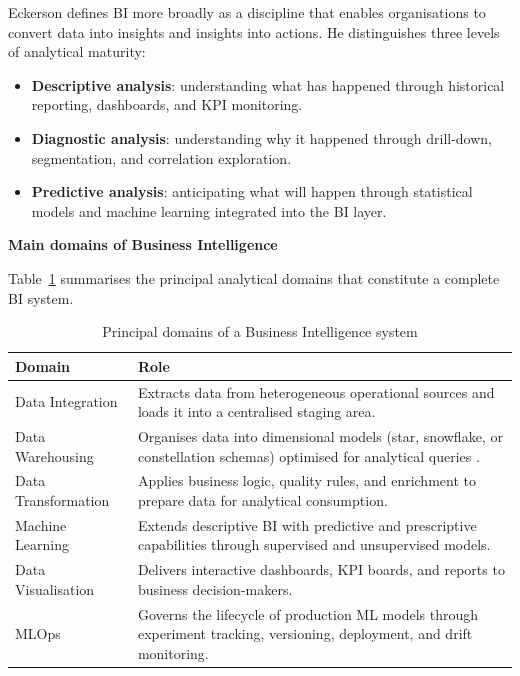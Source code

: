 Eckerson \cite{eckerson2010} defines BI more broadly as a discipline that enables
organisations to convert data into insights and insights into actions. He distinguishes
three levels of analytical maturity:

\begin{itemize}
    \item \textbf{Descriptive analysis}: understanding what has happened through historical
    reporting, dashboards, and KPI monitoring.
    \item \textbf{Diagnostic analysis}: understanding why it happened through drill-down,
    segmentation, and correlation exploration.
    \item \textbf{Predictive analysis}: anticipating what will happen through statistical
    models and machine learning integrated into the BI layer.
\end{itemize}

\textbf{Main domains of Business Intelligence}

Table~\ref{tab:bi_domains_general} summarises the principal analytical domains that
constitute a complete BI system.

\begin{table}[H]
\centering
\small
\caption{Principal domains of a Business Intelligence system}
\label{tab:bi_domains_general}
\begin{tabular}{|p{3.2cm}|p{9cm}|}
\hline
\rowcolor{blue!15}
\textbf{Domain} & \textbf{Role} \\
\hline
Data Integration & Extracts data from heterogeneous operational sources and loads it into
a centralised staging area. \\
\hline
Data Warehousing & Organises data into dimensional models (star, snowflake, or constellation
schemas) optimised for analytical queries \cite{kimball2013}. \\
\hline
Data Transformation & Applies business logic, quality rules, and enrichment to prepare
data for analytical consumption. \\
\hline
Machine Learning & Extends descriptive BI with predictive and prescriptive capabilities
through supervised and unsupervised models. \\
\hline
Data Visualisation & Delivers interactive dashboards, KPI boards, and reports to
business decision-makers. \\
\hline
MLOps & Governs the lifecycle of production ML models through experiment tracking,
versioning, deployment, and drift monitoring. \\
\hline
\end{tabular}
\end{table}

